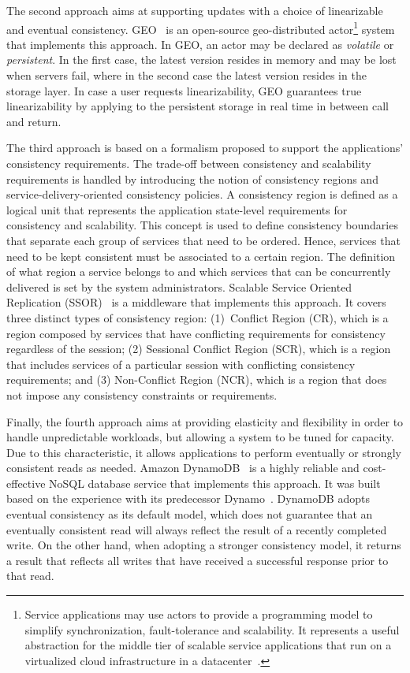 {\rc The second approach aims at supporting updates with a choice of linearizable and eventual consistency. GEO~\cite{BernsteinBBCFKK17} is an open-source geo-distributed actor\footnote{Service applications may use actors to provide a programming model to simplify synchronization, fault-tolerance and scalability. It represents a useful abstraction for the middle tier of scalable service applications that run on a virtualized cloud infrastructure in a datacenter~\cite{BernsteinBBCFKK17}.} system that implements this approach. In GEO, an actor may be declared as \textit{volatile} or \textit{persistent}. In the first case, the latest version resides in memory and may be lost when servers fail, where in the second case the latest version resides in the storage layer. In case a user requests linearizability, GEO guarantees true linearizability by applying to the persistent storage in real time in between call and return.}

The third approach is based on a formalism proposed to support the applications’ consistency requirements. The trade-off between consistency and scalability requirements is handled by introducing the notion of consistency regions and service-delivery-oriented consistency policies. A consistency region is defined as a logical unit that represents the application state-level requirements for consistency and scalability. This concept is used to define consistency boundaries that separate each group of services that need to be ordered. Hence, services that need to be kept consistent must be associated to a certain region. The definition of what region a service belongs to and which services that can be concurrently delivered is set by the system administrators. 
Scalable Service Oriented Replication (SSOR)~\cite{Chen:2014} is a middleware that implements this approach. It covers three distinct types of consistency region: (1)~Conflict Region (CR), which is a region composed by services that have conflicting requirements for consistency regardless of the session; (2) Sessional Conflict Region (SCR), which is a region that includes services of a particular session with conflicting consistency requirements; and (3) Non-Con\-flict Region (NCR), which is a region that does not impose any consistency constraints or requirements.

Finally, the fourth approach aims at providing elasticity and flexibility in order to handle unpredictable workloads, but allowing a system to be tuned for capacity. Due to this characteristic, it allows applications to perform eventually or strongly consistent reads as needed. Amazon DynamoDB~\cite{sivasubramanian2012amazon} is a highly reliable and cost-effective NoSQL database service that implements this  approach. It was built based on the experience with its predecessor Dynamo~\cite{decandia2007dynamo}. DynamoDB adopts eventual consistency as its default model, which does not guarantee that an eventually consistent read will always reflect the result of a recently completed write. On the other hand, when adopting a stronger consistency model, it returns a result that reflects all writes that have received a successful response prior to that read.

